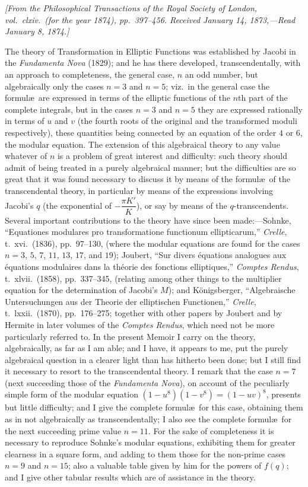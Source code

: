 \documentclass[11pt]{article}
\begin{document}
\noindent\textit{[From the Philosophical Transactions of the Royal Society of London, vol.\ clxiv.\ (for the year 1874), pp.\ 397--456. Received January 14, 1873,---Read January 8, 1874.]}

\medskip

The theory of Transformation in Elliptic Functions was established by Jacobi in the \textit{Fundamenta Nova} (1829); and he has there developed, transcendentally, with an approach to completeness, the general case, $n$ an odd number, but algebraically only the cases $n = 3$ and $n = 5$; viz.\ in the general case the formul\ae\ are expressed in terms of the elliptic functions of the $n$th part of the complete integrals, but in the cases $n = 3$ and $n = 5$ they are expressed rationally in terms of $u$ and $v$ (the fourth roots of the original and the transformed moduli respectively), these quantities being connected by an equation of the order $4$ or $6$, the modular equation. The extension of this algebraical theory to any value whatever of $n$ is a problem of great interest and difficulty: such theory should admit of being treated in a purely algebraical manner; but the difficulties are so great that it was found necessary to discuss it by means of the formul\ae\ of the transcendental theory, in particular by means of the expressions involving Jacobi's $q$ (the exponential of $-\dfrac{\pi K'}{K}$), or say by means of the $q$-transcendents. Several important contributions to the theory have since been made:---Sohnke, ``Equationes modulares pro transformatione functionum ellipticarum,'' \textit{Crelle}, t.\ xvi.\ (1836), pp.\ 97--130, (where the modular equations are found for the cases $n = 3$, $5$, $7$, $11$, $13$, $17$, and $19$); Joubert, ``Sur divers \'equations analogues aux \'equations modulaires dans la th\'eorie des fonctions elliptiques,'' \textit{Comptes Rendus}, t.\ xlvii.\ (1858), pp.\ 337--345, (relating among other things to the multiplier equation for the determination of Jacobi's $M$); and K\"onigsberger, ``Algebraische Untersuchungen aus der Theorie der elliptischen Functionen,'' \textit{Crelle}, t.\ lxxii.\ (1870), pp.\ 176--275; together with other papers by Joubert and by Hermite in later volumes of the \textit{Comptes Rendus}, which need not be more particularly referred to. In the present Memoir I carry on the theory, algebraically, as far as I am able; and I have, it appears to me, put the purely algebraical question in a clearer light than has hitherto been done; but I still find it necessary to resort to the transcendental theory. I remark that the case $n = 7$ (next succeeding those of the \textit{Fundamenta Nova}), on account of the peculiarly simple form of the modular equation $(1-u^{8})(1-v^{8})=(1-uv)^{8}$, presents but little difficulty; and I give the complete formul\ae\ for this case, obtaining them as in not algebraically as transcendentally; I also see the complete formul\ae\ for the next succeeding prime value $n = 11$. For the sake of completeness it is necessary to reproduce Sohnke's modular equations, exhibiting them for greater clearness in a square form, and adding to them those for the non-prime cases $n = 9$ and $n = 15$; also a valuable table given by him for the powers of $f(q)$; and I give other tabular results which are of assistance in the theory.
\end{document}
